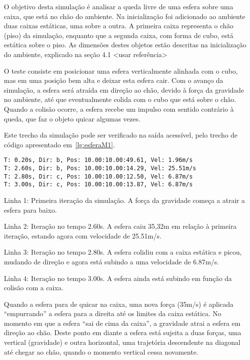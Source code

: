 \documentclass[12pt]{article}
\begin{document}
O objetivo desta simulação é analisar a queda livre de uma esfera sobre uma caixa, que está no chão do ambiente. Na inicialização foi adicionado ao ambiente duas caixas estáticas, uma sobre a outra. A primeira caixa representa o chão (piso) da simulação, enquanto que a segunda caixa, com forma de cubo, está estática sobre o piso. As dimensões destes objetos estão descritas na inicialização do ambiente, explicado na seção 4.1 <usar referência>

O teste consiste em posicionar uma esfera verticalmente alinhada com o cubo, mas em uma posição bem alta e deixar esta esfera cair. Com o avanço da simulação, a esfera será atraída em direção ao chão, devido à força da gravidade no ambiente, até que eventualmente colida com o cubo que está sobre o chão. Quando a colisão ocorre, a esfera recebe um impulso com sentido contrário à queda, que faz o objeto quicar algumas vezes. 

Este trecho da simulação pode ser verificado na saída acessível, pelo trecho de código apresentado em~\ref{lg:esferaM1}. 

\begin{lstlisting}[frame=single,caption=Inicialização do ambiente\label{lg:esferaM1}]
T: 0.20s, Dir: b, Pos: 10.00:10.00:49.61, Vel: 1.96m/s
T: 2.60s, Dir: b, Pos: 10.00:10.00:14.29, Vel: 25.51m/s
T: 2.80s, Dir: c, Pos: 10.00:10.00:12.50, Vel: 6.87m/s
T: 3.00s, Dir: c, Pos: 10.00:10.00:13.87, Vel: 6.87m/s
\end{lstlisting}

Linha 1:  Primeira iteração da simulação. A força da gravidade começa a atrair a esfera para baixo.

Linha 2: Iteração no tempo 2.60s. A esfera caiu 35,32m em relação à primeira iteração, estando agora com velocidade de 25.51m/s.

Linha 3: Iteração no tempo 2.80s. A esfera colidiu com a caixa estática e picou, mudando de direção e agora está subindo a uma velocidade de 6.87m/s. 

Linha 4: Iteração no tempo 3.00s. A esfera ainda está subindo em função da colisão com a caixa.

Quando a esfera para de quicar na caixa, uma nova força (35m/s) é aplicada “empurrando” a esfera para a direita até os limites da caixa estática.  No momento em que a esfera “sai de cima da caixa”, a gravidade atrai a esfera em direção ao chão. Deste ponto em diante a esfera está sujeita a duas forças, uma vertical (gravidade) e outra horizontal, uma trajetória descendente na diagonal até chegar ao chão, quando o momento vertical cessa novamente.
\end{document}
